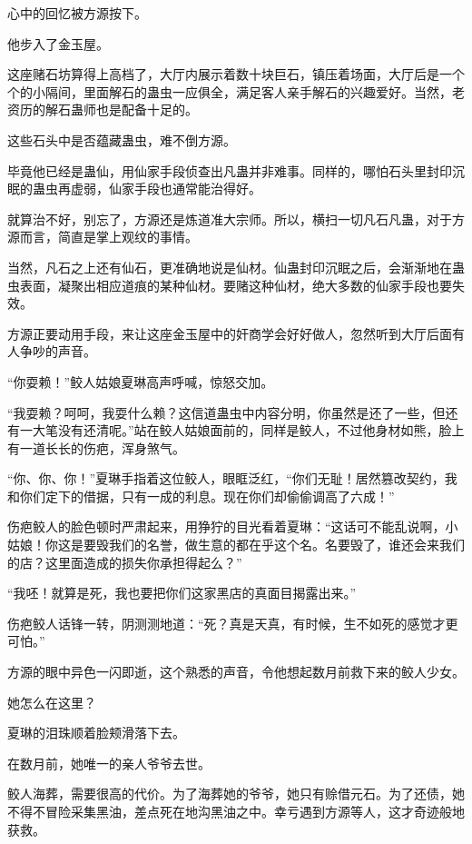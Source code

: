 
\begin{this_body}

心中的回忆被方源按下。

他步入了金玉屋。

这座赌石坊算得上高档了，大厅内展示着数十块巨石，镇压着场面，大厅后是一个个的小隔间，里面解石的蛊虫一应俱全，满足客人亲手解石的兴趣爱好。当然，老资历的解石蛊师也是配备十足的。

这些石头中是否蕴藏蛊虫，难不倒方源。

毕竟他已经是蛊仙，用仙家手段侦查出凡蛊并非难事。同样的，哪怕石头里封印沉眠的蛊虫再虚弱，仙家手段也通常能治得好。

就算治不好，别忘了，方源还是炼道准大宗师。所以，横扫一切凡石凡蛊，对于方源而言，简直是掌上观纹的事情。

当然，凡石之上还有仙石，更准确地说是仙材。仙蛊封印沉眠之后，会渐渐地在蛊虫表面，凝聚出相应道痕的某种仙材。要赌这种仙材，绝大多数的仙家手段也要失效。

方源正要动用手段，来让这座金玉屋中的奸商学会好好做人，忽然听到大厅后面有人争吵的声音。

“你耍赖！”鲛人姑娘夏琳高声呼喊，惊怒交加。

“我耍赖？呵呵，我耍什么赖？这信道蛊虫中内容分明，你虽然是还了一些，但还有一大笔没有还清呢。”站在鲛人姑娘面前的，同样是鲛人，不过他身材如熊，脸上有一道长长的伤疤，浑身煞气。

“你、你、你！”夏琳手指着这位鲛人，眼眶泛红，“你们无耻！居然篡改契约，我和你们定下的借据，只有一成的利息。现在你们却偷偷调高了六成！”

伤疤鲛人的脸色顿时严肃起来，用狰狞的目光看着夏琳：“这话可不能乱说啊，小姑娘！你这是要毁我们的名誉，做生意的都在乎这个名。名要毁了，谁还会来我们的店？这里面造成的损失你承担得起么？”

“我呸！就算是死，我也要把你们这家黑店的真面目揭露出来。”

伤疤鲛人话锋一转，阴测测地道：“死？真是天真，有时候，生不如死的感觉才更可怕。”

方源的眼中异色一闪即逝，这个熟悉的声音，令他想起数月前救下来的鲛人少女。

她怎么在这里？

夏琳的泪珠顺着脸颊滑落下去。

在数月前，她唯一的亲人爷爷去世。

鲛人海葬，需要很高的代价。为了海葬她的爷爷，她只有赊借元石。为了还债，她不得不冒险采集黑油，差点死在地沟黑油之中。幸亏遇到方源等人，这才奇迹般地获救。


\end{this_body}
